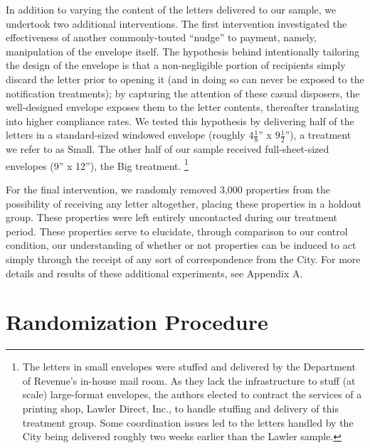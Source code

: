\documentclass[12pt,titlepage]{article}
\begin{document}
In addition to varying the content of the letters delivered to our sample,
we undertook two additional interventions. The first intervention 
investigated the effectiveness of another commonly-touted “nudge” to payment,
namely, manipulation of the envelope itself. The hypothesis behind 
intentionally tailoring the design of the envelope is that a non-negligible 
portion of recipients simply discard the letter prior to opening it 
(and in doing so can never be exposed to the notification treatments); 
by capturing the attention of these casual disposers, the well-designed 
envelope exposes them to the letter contents, thereafter translating into 
higher compliance rates. We tested this hypothesis by delivering half of 
the letters in a standard-sized windowed envelope
(roughly $4\frac18$'' x $9\frac12$''), a treatment we refer to as Small. 
The other half of our sample received full-sheet-sized envelopes (9'' x 12''), 
the Big treatment. 
\footnote{
	The letters in small envelopes were stuffed and delivered by the 
	Department of Revenue's in-house mail room. As they lack the 
	infrastructure to stuff (at scale) large-format envelopes, the authors 
	elected to contract the services of a printing shop, Lawler Direct, Inc., 
	to handle stuffing and delivery of this treatment group. Some 
	coordination issues led to the letters handled by the City being 
	delivered roughly two weeks earlier than the Lawler sample. 
}

For the final intervention, we randomly removed 3,000 properties from 
the possibility of receiving any letter altogether, placing these 
properties in a holdout group. These properties were left entirely 
uncontacted during our treatment period. These properties serve to 
elucidate, through comparison to our control condition, our 
understanding of whether or not properties can be induced to act simply 
through the receipt of any sort of correspondence from the City. 
For more details and results of these additional experiments, see Appendix A.

\section{Randomization Procedure}

\end{document}
